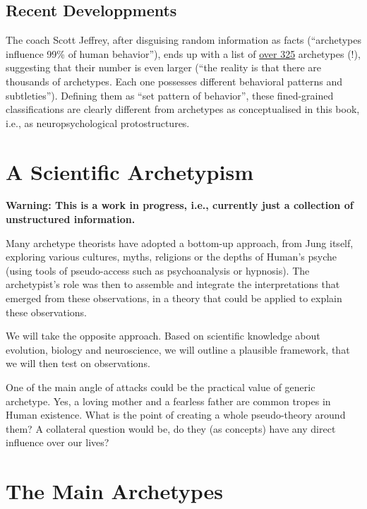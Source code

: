 \documentclass[]{book}
\begin{document}
\hypertarget{recent-developpments}{%
\section{Recent Developpments}\label{recent-developpments}}

The coach Scott Jeffrey, after disguising random information as facts (``archetypes influence 99\% of human behavior''), ends up with a list of \href{https://scottjeffrey.com/archetypes-list/}{over 325} archetypes (!), suggesting that their number is even larger (``the reality is that there are thousands of archetypes. Each one possesses different behavioral patterns and subtleties''). Defining them as ``set pattern of behavior'', these fined-grained classifications are clearly different from archetypes as conceptualised in this book, i.e., as neuropsychological protostructures.

\hypertarget{a-scientific-archetypism}{%
\chapter{A Scientific Archetypism}\label{a-scientific-archetypism}}

\textbf{Warning: This is a work in progress, i.e., currently just a collection of unstructured information.}

Many archetype theorists have adopted a bottom-up approach, from Jung itself, exploring various cultures, myths, religions or the depths of Human's psyche (using tools of pseudo-access such as psychoanalysis or hypnosis). The archetypist's role was then to assemble and integrate the interpretations that emerged from these observations, in a theory that could be applied to explain these observations.

We will take the opposite approach. Based on scientific knowledge about evolution, biology and neuroscience, we will outline a plausible framework, that we will then test on observations.

One of the main angle of attacks could be the practical value of generic archetype. Yes, a loving mother and a fearless father are common tropes in Human existence. What is the point of creating a whole pseudo-theory around them? A collateral question would be, do they (as concepts) have any direct influence over our lives?

\hypertarget{the-main-archetypes}{%
\chapter{The Main Archetypes}\label{the-main-archetypes}}
\end{document}

